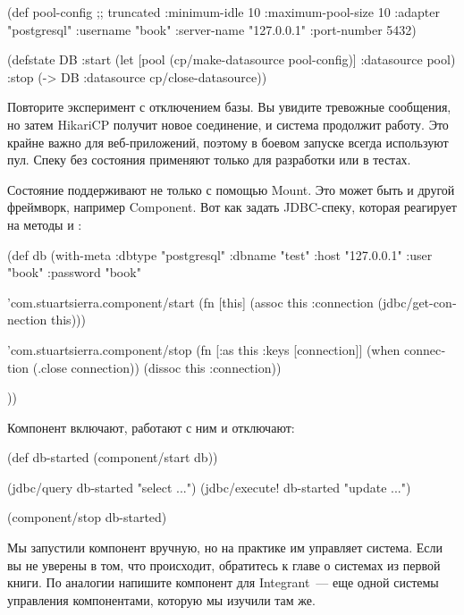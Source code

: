 \begin{english}
  \begin{clojure}
(def pool-config ;; truncated
  {:minimum-idle       10
   :maximum-pool-size  10
   :adapter            "postgresql"
   :username           "book"
   :server-name        "127.0.0.1"
   :port-number        5432})

(defstate DB
  :start
  (let [pool (cp/make-datasource pool-config)]
    {:datasource pool})
  :stop
  (-> DB :datasource cp/close-datasource))
  \end{clojure}
\end{english}

Повторите эксперимент с отключением базы. Вы увидите тревожные сообщения, но затем HikariCP получит новое соединение, и система продолжит работу. Это крайне важно для веб-приложений, поэтому в боевом запуске всегда используют пул. Спеку без состояния применяют только для разработки или в тестах.

Состояние поддерживают не только с помощью Mount. Это может быть и другой фреймворк, например Component. Вот как задать JDBC-спеку, которая реагирует на методы  и :

\begin{english}
  \begin{clojure}
(def db
  (with-meta
    {:dbtype "postgresql"
     :dbname "test"
     :host "127.0.0.1"
     :user "book"
     :password "book"}

    {'com.stuartsierra.component/start
     (fn [this]
       (assoc this :connection
              (jdbc/get-connection this)))

     'com.stuartsierra.component/stop
     (fn [{:as this :keys [connection]}]
       (when connection
         (.close connection))
       (dissoc this :connection))}))
  \end{clojure}
\end{english}

Компонент включают, работают с ним и отключают:

\begin{english}
  \begin{clojure}
(def db-started (component/start db))

(jdbc/query db-started "select ...")
(jdbc/execute! db-started "update ...")

(component/stop db-started)
  \end{clojure}
\end{english}

Мы запустили компонент вручную, но на практике им управляет система. Если вы не уверены в том, что происходит, обратитесь к главе о системах из первой книги. По аналогии напишите компонент для Integrant~--- еще одной системы управления компонентами, которую мы изучили там же.

